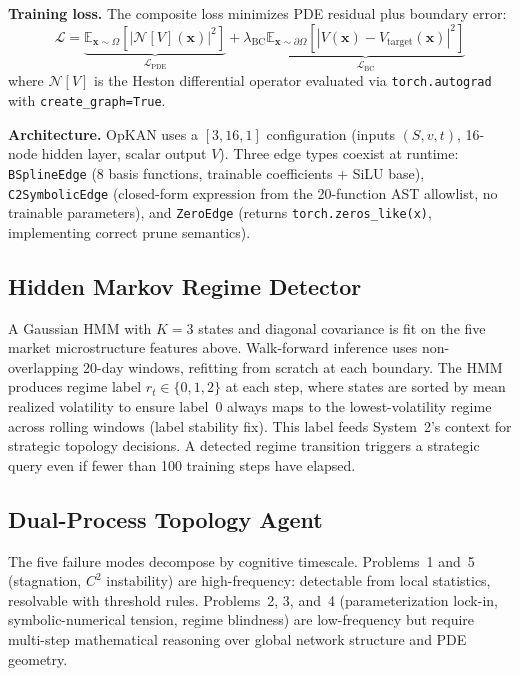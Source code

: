\documentclass[11pt,a4paper]{article}
\begin{document}
\textbf{Training loss.} The composite loss minimizes PDE residual plus boundary error:
\begin{equation}
\mathcal{L} = \underbrace{\mathbb{E}_{\bm{x}\sim\Omega}\!\left[\left|\mathcal{N}[V](\bm{x})\right|^2\right]}_{\mathcal{L}_\text{PDE}}
+ \lambda_\text{BC}\underbrace{\mathbb{E}_{\bm{x}\sim\partial\Omega}\!\left[\left|V(\bm{x})-V_\text{target}(\bm{x})\right|^2\right]}_{\mathcal{L}_\text{BC}}
\label{eq:loss}
\end{equation}
where $\mathcal{N}[V]$ is the Heston differential operator evaluated via
\texttt{torch.autograd} with \texttt{create\_graph=True}.

\textbf{Architecture.} OpKAN uses a $[3,16,1]$ configuration (inputs $(S,v,t)$, 16-node
hidden layer, scalar output $V$). Three edge types coexist at runtime:
\texttt{BSplineEdge} (8 basis functions, trainable coefficients + SiLU base),
\texttt{C2SymbolicEdge} (closed-form expression from the 20-function AST allowlist, no
trainable parameters), and \texttt{ZeroEdge} (returns \texttt{torch.zeros\_like(x)},
implementing correct prune semantics).

\subsection{Hidden Markov Regime Detector}

A Gaussian HMM with $K=3$ states and diagonal covariance is fit on the five market
microstructure features above. Walk-forward inference uses non-overlapping 20-day
windows, refitting from scratch at each boundary. The HMM produces regime label
$r_t\in\{0,1,2\}$ at each step, where states are sorted by mean realized volatility
to ensure label~0 always maps to the lowest-volatility regime across rolling windows
(label stability fix). This label feeds System~2's context for strategic topology
decisions. A detected regime transition triggers a strategic query even if fewer than
100 training steps have elapsed.

\subsection{Dual-Process Topology Agent}

The five failure modes decompose by cognitive timescale. Problems~1 and~5 (stagnation,
$C^2$ instability) are high-frequency: detectable from local statistics, resolvable with
threshold rules. Problems~2, 3, and~4 (parameterization lock-in, symbolic-numerical
tension, regime blindness) are low-frequency but require multi-step mathematical
reasoning over global network structure and PDE geometry.
\end{document}
